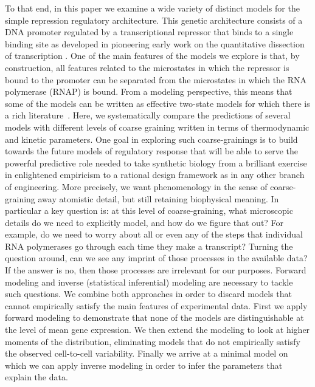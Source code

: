 To that end, in this paper we examine a wide variety of distinct models for the
simple repression regulatory architecture. This genetic architecture consists of
a DNA promoter regulated by a transcriptional repressor that binds to a single
binding site as developed in pioneering early work on the quantitative
dissection of transcription \cite{Oehler1994, Oehler1990}. One of the main
features of the models we explore is that, by construction, all features related
to the microstates in which the repressor is bound to the promoter can be
separated from the microstates in which the RNA polymerase (RNAP) is bound. From
a modeling perspective, this means that some of the models can be written as
effective two-state models for which there is a rich
literature~\cite{Peccoud1995, Raj2006, Shahrezaei2008, Iyer-Biswas2009,
Tkacik2009, Sanchez2013, Jones2014, So2011, Munsky2012, Kumar2015}. Here, we
systematically compare the predictions of several models with different levels
of coarse graining written in terms of thermodynamic and kinetic parameters. One
goal in exploring such coarse-grainings is to build towards the future models of
regulatory response that will be able to serve the powerful predictive role
needed to take synthetic biology from a brilliant exercise in enlightened
empiricism to a rational design framework as in any other branch of engineering.
More precisely, we want phenomenology in the sense of coarse-graining away
atomistic detail, but still retaining biophysical meaning. In particular a key
question is: at this level of coarse-graining, what microscopic details do we
need to explicitly model, and how do we figure that out? For example, do we need
to worry about all or even any of the steps that individual RNA polymerases go
through each time they make a transcript? Turning the question around, can we
see any imprint of those processes in the available data? If the answer is no,
then those processes are irrelevant for our purposes. Forward modeling and
inverse (statistical inferential) modeling are necessary to tackle such
questions. We combine both approaches in order to discard models that cannot
empirically satisfy the main features of experimental data. First we apply
forward modeling to demonstrate that none of the models are distinguishable at
the level of mean gene expression. We then extend the modeling to look at higher
moments of the distribution, eliminating models that do not empirically satisfy
the observed cell-to-cell variability. Finally we arrive at a minimal model on
which we can apply inverse modeling in order to infer the parameters that
explain the data.

